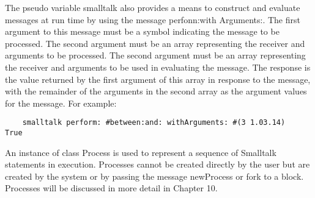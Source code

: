 The pseudo variable smalltalk also provides a means to construct and
evaluate messages at run time by using the message perfonn:with
Arguments:. The first argument to this message must be a symbol indicating
the message to be processed. The second argument must be an array
representing the receiver and arguments to be processed. The second argument must be an array representing the receiver and arguments to be
used in evaluating the message. The response is the value returned by the
first argument of this array in response to the message, with the remainder
of the arguments in the second array as the argument values for the message. For example:
\begin{lstlisting}
    smalltalk perform: #between:and: withArguments: #(3 1.03.14)
True
\end{lstlisting}

An instance of class Process is used to represent a sequence of Smalltalk statements in execution. Processes cannot be created directly by
the user but are created by the system or by passing the message newProcess or fork to a block. Processes will be discussed in more detail in
Chapter 10.
